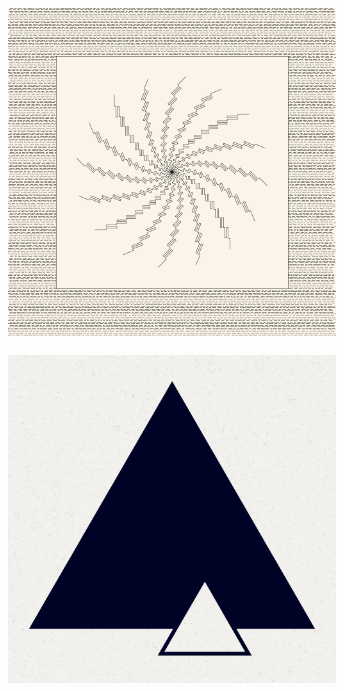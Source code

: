 \documentclass[11pt,twoside]{book}
\begin{document}
\begin{figure}[!ht]
\includegraphics[width=246pt]{pistachio-and-peach-5f4443b7-3754-40f6-86a6-72e17e8956df.png}
\end{figure}
\newpage
{}
\fancyfoot[CE,CO]{\fontsize{10}{12}\selectfont \thepage}
\begin{figure}[!ht]
\includegraphics[width=246pt]{lemon-3805018e-842b-4196-95b2-8257549c82d0.png}
\end{figure}
\newpage
{}
\fancyfoot[CE,CO]{\fontsize{10}{12}\selectfont \thepage}
\end{document}

